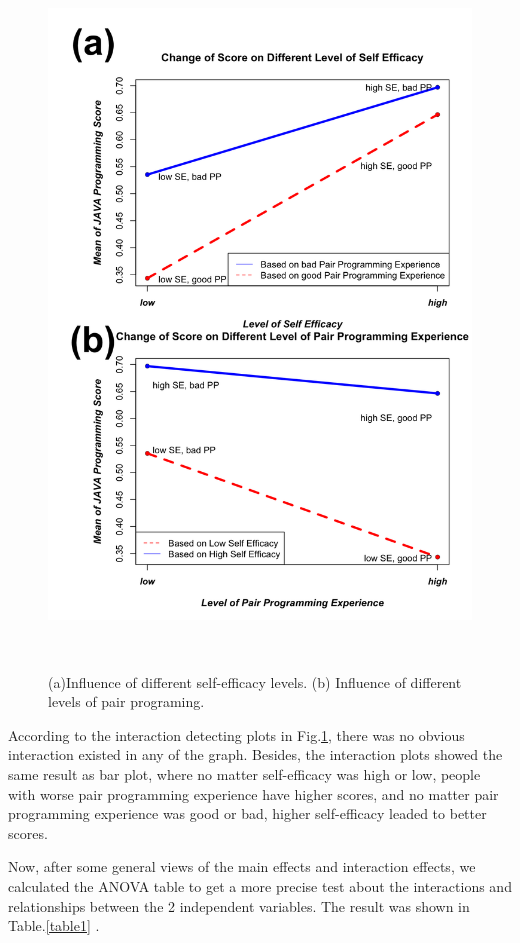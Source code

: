 \documentclass{sigchi}
\begin{document}
\begin{figure}
\centering
  \includegraphics[width=0.6\columnwidth]{figures/fig4}
  \caption{(a)Influence of different self-efficacy levels. (b) Influence of different levels of pair programing.}~\label{fig:figure4}
\end{figure}

According to the interaction detecting plots in Fig.\ref{fig:figure4}, there was no obvious interaction existed in any of the graph. Besides, the interaction plots showed the same result as bar plot, where no matter self-efficacy was high or low, people with worse pair programming experience have higher scores, and no matter pair programming experience was good or bad, higher self-efficacy leaded to better scores.

Now, after some general views of the main effects and interaction effects, we calculated the ANOVA table to get a more precise test about the interactions and relationships between the 2 independent variables. The result was shown in Table.\ref{table1} .
\end{document}
